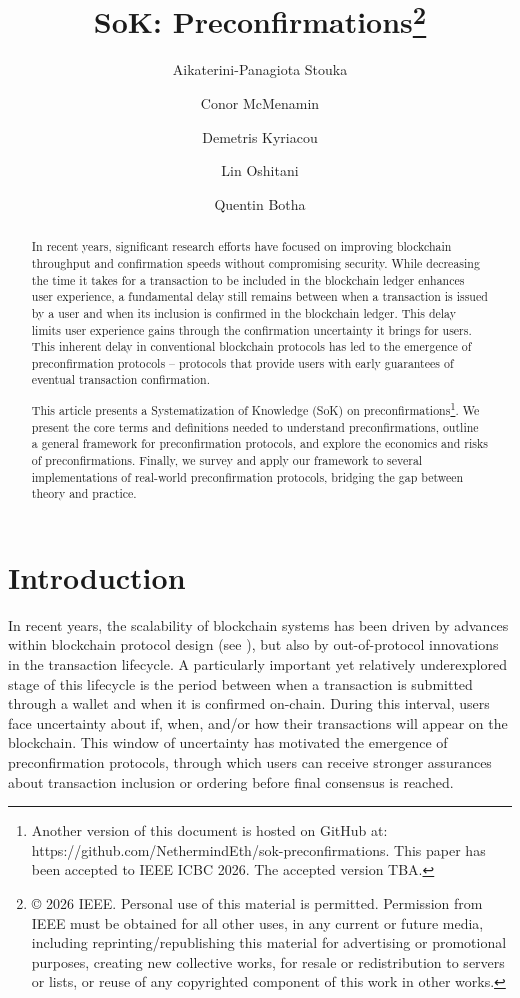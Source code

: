 \documentclass[a4paper]{article}
\title{SoK: Preconfirmations\footnote{© 2026 IEEE.  Personal use of this material is permitted.  Permission from IEEE must be obtained for all other uses, in any current or future media, including reprinting/republishing this material for advertising or promotional purposes, creating new collective works, for resale or redistribution to servers or lists, or reuse of any copyrighted component of this work in other works.}}
\author[1]{Aikaterini-Panagiota Stouka}
\author[1]{Conor McMenamin}
\author[3]{Demetris Kyriacou}
\author[1]{Lin Oshitani}
\author[2]{Quentin Botha}
\affil[1]{\small\textit{Nethermind Research}}
\affil[2]{\small\textit{Research Institute for Cryptoeconomics, WU Vienna}}
\affil[3]{\small\textit{Imperial College London}}
\theoremstyle{boldstyle}
\begin{document}
\maketitle

\begin{abstract}
 
In recent years, significant research efforts have focused on improving blockchain throughput and confirmation speeds without compromising security. While decreasing the time it takes for a transaction to be included in the blockchain ledger enhances user experience, a fundamental delay still remains between when a transaction is issued by a user and when its inclusion is confirmed in the blockchain ledger. This delay limits user experience gains through the confirmation uncertainty it brings for users. This inherent delay in conventional blockchain protocols has led to the emergence of preconfirmation protocols -- protocols that provide users with early guarantees of eventual transaction confirmation.

This article presents a Systematization of Knowledge (SoK) on preconfirmations\footnote{Another version of this document is hosted on GitHub at: https://github.com/NethermindEth/sok-preconfirmations. This paper has been accepted to IEEE ICBC 2026. The accepted version TBA.}. We present the core terms and definitions needed to understand preconfirmations, outline a general framework for preconfirmation protocols, and explore the economics and risks of preconfirmations. Finally, we survey and apply our framework to several implementations of real-world preconfirmation protocols, bridging the gap between theory and practice.
 
 
 

 
\end{abstract}





\setlength{\marginparwidth}{2cm} 

\section{Introduction}



In recent years, the scalability of blockchain systems has been driven by advances within blockchain protocol design (see \cite{cryptoeprint:2018/1119, che2025manifoldchain, Fitzi2020ProofofStakeBP, neiheiser2025anthemiusefficientmodular, ethereum_scaling}), but also by out-of-protocol innovations in the transaction lifecycle.
A particularly important yet relatively underexplored stage of this lifecycle is the period between when a transaction is submitted through a wallet and when it is confirmed on-chain. During this interval, users face uncertainty about if, when, and/or how their transactions will appear on the blockchain. This window of uncertainty has motivated the emergence of preconfirmation protocols, through which users can receive stronger assurances about transaction inclusion or ordering before final consensus is reached.
\end{document}
